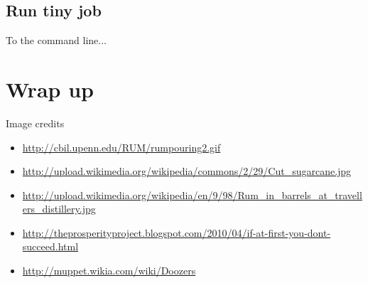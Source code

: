 \documentclass{beamer}
\begin{document}
\subsection{Run tiny job}

\begin{frame}
  To the command line...
\end{frame}

\section{Wrap up}

\begin{frame}{Image credits}
  \begin{itemize}
    \item \url{http://cbil.upenn.edu/RUM/rumpouring2.gif}
    \item \url{http://upload.wikimedia.org/wikipedia/commons/2/29/Cut\_sugarcane.jpg}
    \item \url{http://upload.wikimedia.org/wikipedia/en/9/98/Rum\_in\_barrels\_at\_travellers\_distillery.jpg}
    \item \url{http://theprosperityproject.blogspot.com/2010/04/if-at-first-you-dont-succeed.html}
    \item \url{http://muppet.wikia.com/wiki/Doozers}
  \end{itemize}
  
\end{frame}
\end{document}
